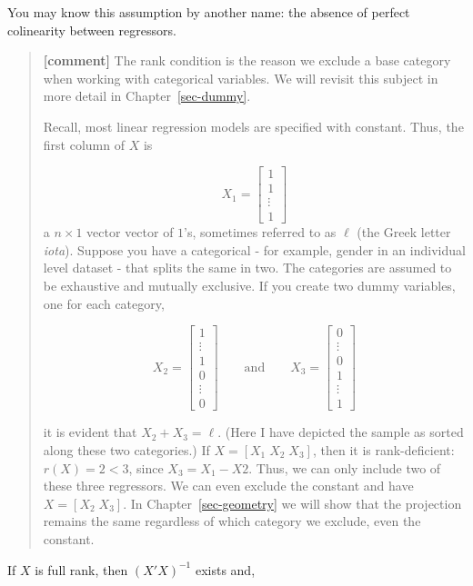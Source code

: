 \documentclass[
  letterpaper,
  DIV=11,
  numbers=noendperiod]{scrreprt}
\begin{document}
You may know this assumption by another name: the absence of perfect
colinearity between regressors.

\begin{quote}
\textbf{{[}comment{]}} The rank condition is the reason we exclude a
base category when working with categorical variables. We will revisit
this subject in more detail in Chapter~\ref{sec-dummy}.

Recall, most linear regression models are specified with constant. Thus,
the first column of \(X\) is

\[ X_1 = \begin{bmatrix}1 \\ 1 \\ \vdots \\ 1\end{bmatrix} \] a
\(n\times 1\) vector vector of \(1\)'s, sometimes referred to as
\(\ell\) (the Greek letter \emph{iota}). Suppose you have a categorical
- for example, gender in an individual level dataset - that splits the
same in two. The categories are assumed to be exhaustive and mutually
exclusive. If you create two dummy variables, one for each category,

\[ X_2 = \begin{bmatrix}1 \\ \vdots \\1\\0\\ \vdots \\ 0\end{bmatrix}\qquad\text{and}\qquad X_3 = \begin{bmatrix}0 \\ \vdots \\0\\1\\ \vdots \\ 1\end{bmatrix} \]

it is evident that \(X_2+X_3 = \ell\). (Here I have depicted the sample
as sorted along these two categories.) If \(X=[X_1\;X_2\;X_3]\), then it
is rank-deficient: \(r(X) = 2<3\), since \(X_3=X_1-X2\). Thus, we can
only include two of these three regressors. We can even exclude the
constant and have \(X=[X_2\;X_3]\). In Chapter~\ref{sec-geometry} we
will show that the projection remains the same regardless of which
category we exclude, even the constant.
\end{quote}

If \(X\) is full rank, then \((X'X)^{-1}\) exists and,
\end{document}
